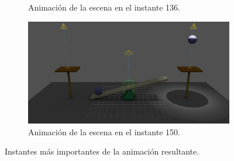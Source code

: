 \begin{figure}[H]
\begin{subfigure}[t]{0.48\textwidth}
      \caption{Animación de la escena en el instante 136.}
   \end{subfigure}
   \hfill
   \begin{subfigure}[t]{0.48\textwidth}
      \centering
      \includegraphics[width=\textwidth]{imagenes/animaciones/general/150.jpg}
      \caption{Animación de la escena en el instante 150.}
   \end{subfigure}
   \caption{Instantes más importantes de la animación resultante.}
\end{figure}